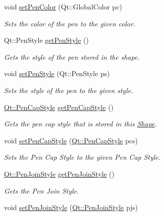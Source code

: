 \begin{DoxyCompactItemize}
void \hyperlink{classLine_a22f3c1710429e1dd2e883562feba090e}{set\+Pen\+Color} (Qt\+::\+Global\+Color pc)
\begin{DoxyCompactList}\small\item\em Sets the color of the pen to the given color. \end{DoxyCompactList}\item 
Qt\+::\+Pen\+Style \hyperlink{classLine_ab461e7db1a107472e97af08183fccc19}{get\+Pen\+Style} ()
\begin{DoxyCompactList}\small\item\em Gets the style of the pen stored in the shape. \end{DoxyCompactList}\item 
void \hyperlink{classLine_ad0c29864440d59e221d4e4af1c3f2899}{set\+Pen\+Style} (Qt\+::\+Pen\+Style ps)
\begin{DoxyCompactList}\small\item\em Sets the style of the pen to the given style. \end{DoxyCompactList}\item 
\hyperlink{shape__input__file__specs_8txt_a622efdcfef6789d4367974d2fe79019e}{Qt\+::\+Pen\+Cap\+Style} \hyperlink{classLine_afee8c712228659e647752e7198d6891c}{get\+Pen\+Cap\+Style} ()
\begin{DoxyCompactList}\small\item\em Gets the pen cap style that is stored in this \hyperlink{classShape}{Shape}. \end{DoxyCompactList}\item 
void \hyperlink{classLine_a2a3fa8792f5f8e582a6cb902514fcc9c}{set\+Pen\+Cap\+Style} (\hyperlink{shape__input__file__specs_8txt_a622efdcfef6789d4367974d2fe79019e}{Qt\+::\+Pen\+Cap\+Style} pcs)
\begin{DoxyCompactList}\small\item\em Sets the Pen Cap Style to the given Pen Cap Style. \end{DoxyCompactList}\item 
\hyperlink{shape__input__file__specs_8txt_a007db2043c6063881de2043c05c9c4a9}{Qt\+::\+Pen\+Join\+Style} \hyperlink{classLine_a070564edc368231e089c8275ccc2e72d}{get\+Pen\+Join\+Style} ()
\begin{DoxyCompactList}\small\item\em Gets the Pen Join Style. \end{DoxyCompactList}\item 
void \hyperlink{classLine_ae996ba09d0e9c4d06360955486b00f84}{set\+Pen\+Join\+Style} (\hyperlink{shape__input__file__specs_8txt_a007db2043c6063881de2043c05c9c4a9}{Qt\+::\+Pen\+Join\+Style} pjs)

\end{DoxyCompactItemize}
